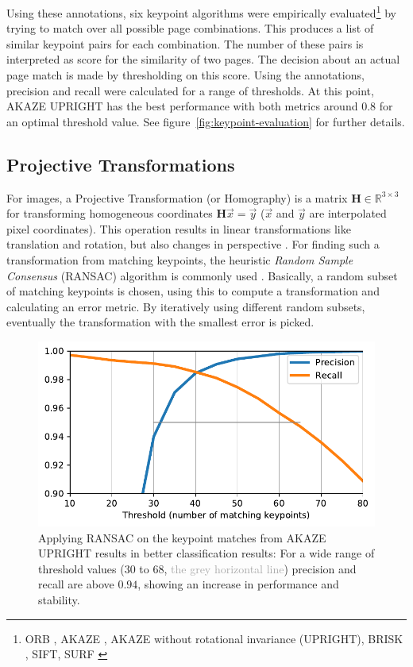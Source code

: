 \documentclass{ltjarticle}
\begin{document}
Using these annotations, six keypoint algorithms were empirically evaluated\footnote{ORB \cite{rublee2011orb}, AKAZE \cite{alcantarilla2011fast}, AKAZE without rotational invariance (UPRIGHT), BRISK \cite{leutenegger2011brisk}, SIFT, SURF \cite{bay2006surf}} by trying to match over all possible page combinations. This produces a list of similar keypoint pairs for each combination. The number of these pairs is interpreted as score for the similarity of two pages. The decision about an actual page match is made by thresholding on this score. Using the annotations, precision and recall were calculated for a range of thresholds. At this point, AKAZE UPRIGHT has the best performance with both metrics around $0.8$ for an optimal threshold value. See figure~\ref{fig:keypoint-evaluation} for further details.

\subsection{Projective Transformations}

For images, a Projective Transformation (or Homography) is a matrix $\mathbf{H} \in \mathbb{R}^{3 \times 3}$ for transforming homogeneous coordinates $\mathbf{H}\vec{x} = \vec{y}$ ($\vec{x}$ and $\vec{y}$ are interpolated pixel coordinates). This operation results in linear transformations like translation and rotation, but also changes in perspective \cite{marschner2015fundamentals}. For finding such a transformation from matching keypoints, the heuristic \emph{Random Sample Consensus} (RANSAC) algorithm is commonly used \cite{fischler1981random}. Basically, a random subset of matching keypoints is chosen, using this to compute a transformation and calculating an error metric. By iteratively using different random subsets, eventually the transformation with the smallest error is picked.

\begin{figure}
    \centering
    \includegraphics[width=\textwidth]{ransac_performance}
    \caption[RANSAC performance]{Applying RANSAC on the keypoint matches from AKAZE UPRIGHT results in better classification results: For a wide range of threshold values (30 to 68, \textcolor{darkgray}{the grey horizontal line}) precision and recall are above $0.94$, showing an increase in performance and stability.}
    \label{fig:ransac}
\end{figure}
\end{document}
